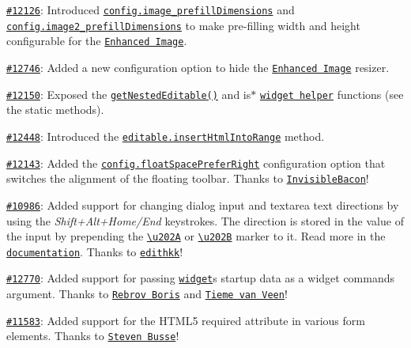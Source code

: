 \begin{DoxyItemize}
\item \href{http://dev.ckeditor.com/ticket/12126}{\tt \#12126}\+: Introduced \href{http://docs.ckeditor.com/#!/api/CKEDITOR.config-cfg-image_prefillDimensions}{\tt {\ttfamily config.\+image\+\_\+prefill\+Dimensions}} and \href{http://docs.ckeditor.com/#!/api/CKEDITOR.config-cfg-image2_prefillDimensions}{\tt {\ttfamily config.\+image2\+\_\+prefill\+Dimensions}} to make pre-\/filling {\ttfamily width} and {\ttfamily height} configurable for the \href{http://ckeditor.com/addon/image2}{\tt Enhanced Image}.
\item \href{http://dev.ckeditor.com/ticket/12746}{\tt \#12746}\+: Added a new configuration option to hide the \href{http://ckeditor.com/addon/image2}{\tt Enhanced Image} resizer.
\item \href{http://dev.ckeditor.com/ticket/12150}{\tt \#12150}\+: Exposed the \href{http://docs.ckeditor.com/#!/api/CKEDITOR.plugins.widget-static-method-getNestedEditable}{\tt {\ttfamily get\+Nested\+Editable()}} and {\ttfamily is$\ast$} \href{http://docs.ckeditor.com/#!/api/CKEDITOR.plugins.widget}{\tt widget helper} functions (see the static methods).
\item \href{http://dev.ckeditor.com/ticket/12448}{\tt \#12448}\+: Introduced the \href{http://docs.ckeditor.com/#!/api/CKEDITOR.editable-method-insertHtmlIntoRange}{\tt {\ttfamily editable.\+insert\+Html\+Into\+Range}} method.
\item \href{http://dev.ckeditor.com/ticket/12143}{\tt \#12143}\+: Added the \href{http://docs.ckeditor.com/#!/api/CKEDITOR.config-cfg-floatSpacePreferRight}{\tt {\ttfamily config.\+float\+Space\+Prefer\+Right}} configuration option that switches the alignment of the floating toolbar. Thanks to \href{http://github.com/InvisibleBacon}{\tt Invisible\+Bacon}!
\item \href{http://dev.ckeditor.com/ticket/10986}{\tt \#10986}\+: Added support for changing dialog input and textarea text directions by using the {\itshape Shift+\+Alt+\+Home/\+End} keystrokes. The direction is stored in the value of the input by prepending the \href{http://unicode.org/cldr/utility/character.jsp?a=202A}{\tt {\ttfamily \textbackslash{}u202A}} or \href{http://unicode.org/cldr/utility/character.jsp?a=202B}{\tt {\ttfamily \textbackslash{}u202B}} marker to it. Read more in the \href{http://docs.ckeditor.com/#!/api/CKEDITOR.dialog.definition.textInput-property-bidi}{\tt documentation}. Thanks to \href{https://github.com/edithkk}{\tt edithkk}!
\item \href{http://dev.ckeditor.com/ticket/12770}{\tt \#12770}\+: Added support for passing \href{http://docs.ckeditor.com/#!/api/CKEDITOR.plugins.widget}{\tt widget}\textquotesingle{}s startup data as a widget command\textquotesingle{}s argument. Thanks to \href{https://github.com/zipp3r}{\tt Rebrov Boris} and \href{https://github.com/tiemevanveen}{\tt Tieme van Veen}!
\item \href{http://dev.ckeditor.com/ticket/11583}{\tt \#11583}\+: Added support for the H\+T\+M\+L5 {\ttfamily required} attribute in various form elements. Thanks to \href{https://github.com/sbusse}{\tt Steven Busse}!
\end{DoxyItemize}

